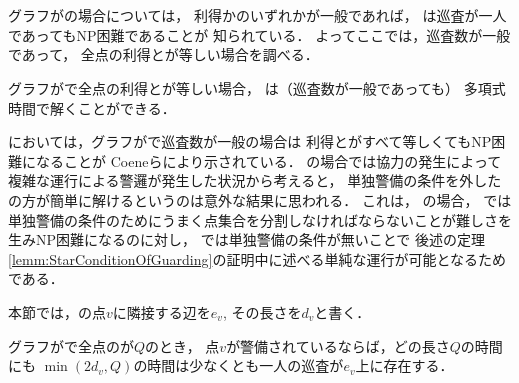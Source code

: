 \chapter{{\graphStar}}
\label{chapter: star}

グラフが{\graphStar}の場合については，
利得か{\maxIdletime}のいずれかが一般であれば，
{\patProb}は巡査が一人であってもNP困難であることが
知られている\cite[Theorem~5 and 6]{coene2011charlemagne}．
よってここでは，巡査数が一般であって，
全点の利得と{\maxIdletime}が等しい場合を調べる．

\begin{theo}
  \label{theo:StarUnaryProfitAndIdletime}
  グラフが{\graphStar}で全点の利得と{\maxIdletime}が等しい場合，
  {\patProb}は（巡査数が一般であっても）
  多項式時間で解くことができる．
\end{theo}

{\independentPatProb}においては，グラフが{\graphStar}で巡査数が一般の場合は
利得と{\maxIdletime}がすべて等しくてもNP困難になることが
Coeneらにより示されている\cite[Theorem~10]{coene2011charlemagne}．
{\graphLine}の場合では協力の発生によって複雑な運行による警邏が発生した状況から考えると，
単独警備の条件を外した{\patProb}の方が簡単に解けるというのは意外な結果に思われる．
これは，
{\graphStar}の場合，
{\independentPatProb}では
単独警備の条件のためにうまく点集合を分割しなければならないことが難しさを生みNP困難になるのに対し，
{\patProb}では単独警備の条件が無いことで
後述の定理\ref{lemm:StarConditionOfGuarding}の証明中に述べる単純な運行が可能となるためである．

本節では，{\graphStar}の点$v$に隣接する辺を$e_v$, その長さを$d_v$と書く．

\begin{lemm}
  \label{lemm:StarCostOfVertex}
  グラフが{\graphStar}で全点の{\maxIdletime}が$Q$のとき，
  点$v$が警備されているならば，どの長さ$Q$の時間にも
  $\min(2d_v, Q)$の時間は少なくとも一人の巡査が$e_v$上に存在する．
\end{lemm}

